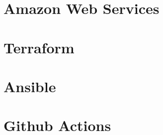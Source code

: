 \documentclass[a4paper]{article}
\begin{document}
    \newpage
    \section{Amazon Web Services}
    \subsection{}
    \subsection{}
    
    \newpage
    \section{Terraform}
    \subsection{}
    \subsection{}
    
    \newpage
    \section{Ansible}
    \subsection{}
    \subsection{}

    \newpage
    \section{Github Actions}
    \subsection{}
    \subsection{}
\end{document}
